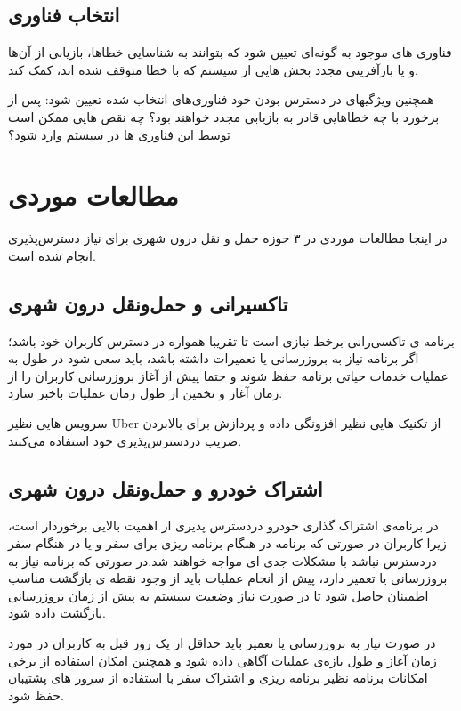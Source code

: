 \subsection{انتخاب فناوری}
فناوری های موجود به گونه‌ای تعیین شود که بتوانند به شناسایی خطا‌ها، بازیابی از آن‌ها و یا بازآفرینی مجدد بخش هایی از سیستم که با خطا متوقف شده اند، کمک کند.

همچنین ویژگیهای در دسترس بودن خود فناوری‌های انتخاب شده تعیین شود: پس از برخورد با چه خطا‌هایی قادر به بازیابی مجدد خواهند بود؟ چه نقص هایی ممکن است توسط این فناوری ها در سیستم وارد شود؟


\section{مطالعات موردی}

در اینجا مطالعات موردی در ۳ حوزه حمل و نقل درون شهری برای نیاز دسترس‌پذیری انجام شده است. 
\subsection{تاکسیرانی و حمل‌و‌نقل درون شهری}
برنامه ی تاکسی‌رانی برخط نیازی است تا تقریبا همواره در دسترس کاربران خود باشد؛ اگر برنامه نیاز به بروز‌رسانی یا تعمیرات داشته باشد، باید سعی شود در طول به عملیات خدمات حیاتی برنامه حفظ شوند و حتما پیش از آغاز بروزرسانی کاربران را از زمان آغاز و تخمین از طول زمان عملیات باخبر سازد.

سرویس هایی نظیر Uber از تکنیک هایی نظیر افزونگی داده و پردازش برای بالابردن ضریب دردسترس‌پذیری خود استفاده می‌کنند.
\subsection{اشتراک خودرو و حمل‌و‌نقل درون شهری}
در برنامه‌ی اشتراک گذاری خودرو دردسترس پذیری از اهمیت بالایی برخوردار است، زیرا کاربران در صورتی که برنامه در هنگام برنامه ریزی برای سفر و یا در هنگام سفر دردسترس نباشد با مشکلات جدی ای مواجه خواهند شد.در صورتی که برنامه نیاز به بروزرسانی یا تعمیر دارد، پیش از انجام عملیات باید از وجود نقطه ی بازگشت مناسب اطمینان حاصل شود تا در صورت نیاز وضعیت سیستم به پیش از زمان بروزرسانی بازگشت داده شود.

در صورت نیاز به بروزرسانی یا تعمیر باید حداقل از یک روز قبل به کاربران در مورد زمان آغاز و طول بازه‌ی عملیات آگاهی  داده شود و همچنین امکان استفاده از برخی امکانات برنامه نظیر برنامه ریزی و اشتراک سفر با استفاده از سرور های پشتیبان حفظ شود.
